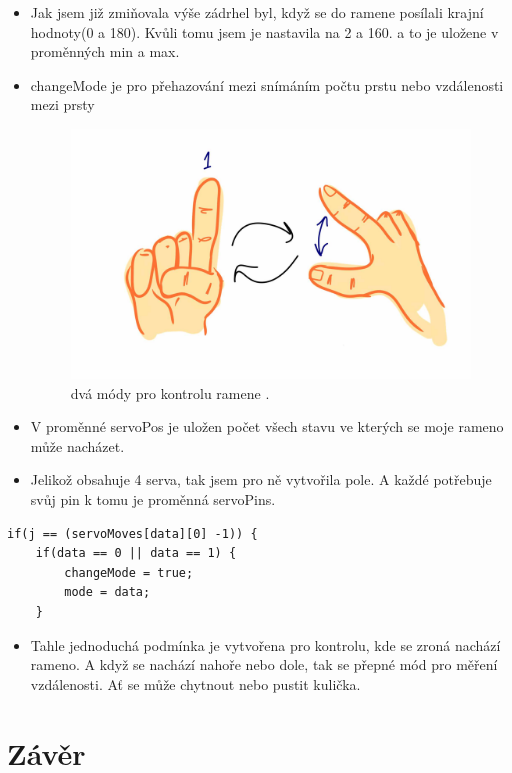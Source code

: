 \documentclass[12pt, a4paper,
twoside,        %
openright
]{report}
\begin{document}
{\begin{itemize}
	\item Jak jsem již zmiňovala výše zádrhel byl, když se do ramene posílali krajní hodnoty(0 a 180). Kvůli tomu jsem je nastavila na 2 a 160. a to je uložene v proměnných min a max.
	\item changeMode je pro přehazování mezi snímáním počtu prstu nebo vzdálenosti mezi prsty
	
\begin{figure}[h]
	
	\centering
	\includegraphics[width=0.3\linewidth]{image/mody.jpg} 
	
	
	\caption{dvá módy pro kontrolu ramene \cite{módy ramene}.} %
	\label{fig:uhlyVGestech} %
\end{figure}
\item   V proměnné servoPos je uložen počet všech stavu ve kterých se moje rameno může nacházet.
\item Jelikož obsahuje 4 serva, tak jsem pro ně vytvořila pole. A každé potřebuje svůj pin k tomu je proměnná servoPins.
	
\end{itemize}



\begin{lstlisting}[style=Python, caption={podmínka pro přepínání módu}]
if(j == (servoMoves[data][0] -1)) {
	if(data == 0 || data == 1) {
		changeMode = true;
		mode = data;
	}
\end{lstlisting}

	\begin{itemize}
		\item Tahle jednoduchá podmínka je vytvořena pro kontrolu, kde se zroná nachází rameno. A když se nachází nahoře nebo dole, tak se přepné mód pro měření vzdálenosti. Ať se může chytnout nebo pustit kulička.

	
\end{itemize}
	
	
	\chapter*{Závěr}
	
}
\end{document}
